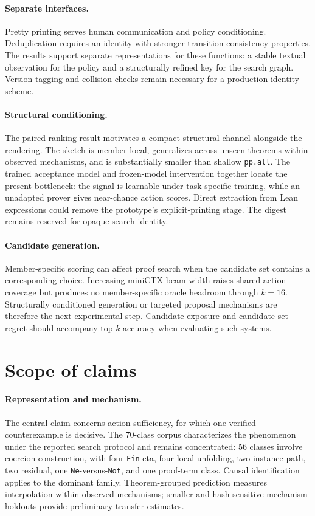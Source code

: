 \documentclass[11pt]{article}
\begin{document}
\paragraph{Separate interfaces.}
Pretty printing serves human communication and policy conditioning.
Deduplication requires an identity with stronger transition-consistency
properties. The results support separate representations for these functions:
a stable textual observation for the policy and a structurally refined key for
the search graph. Version tagging and collision checks remain necessary for a
production identity scheme.

\paragraph{Structural conditioning.}
The paired-ranking result motivates a compact structural channel alongside the
rendering. The sketch is member-local, generalizes across unseen theorems within
observed mechanisms, and is substantially smaller than shallow
\texttt{pp.all}. The trained acceptance model and frozen-model intervention
together locate the present bottleneck: the signal is learnable under
task-specific training, while an unadapted prover gives near-chance action
scores. Direct extraction from
Lean expressions could remove the prototype's explicit-printing stage. The
digest remains reserved for opaque search identity.

\paragraph{Candidate generation.}
Member-specific scoring can affect proof search when the candidate set contains
a corresponding choice. Increasing miniCTX beam width raises shared-action
coverage but produces no member-specific oracle headroom through $k=16$.
Structurally conditioned generation or targeted proposal mechanisms are
therefore the next experimental step. Candidate exposure and candidate-set
regret should accompany top-$k$ accuracy when evaluating such systems.

\section{Scope of claims}

\paragraph{Representation and mechanism.}
The central claim concerns action sufficiency, for which one verified
counterexample is decisive. The 70-class corpus characterizes the phenomenon
under the reported search protocol and remains concentrated: 56 classes involve
coercion construction, with four \texttt{Fin}
eta, four local-unfolding, two instance-path, two residual, one
\texttt{Ne}-versus-\texttt{Not}, and one proof-term class. Causal identification
applies to the dominant family. Theorem-grouped prediction measures
interpolation within observed mechanisms; smaller and hash-sensitive mechanism
holdouts provide preliminary transfer estimates.
\end{document}
